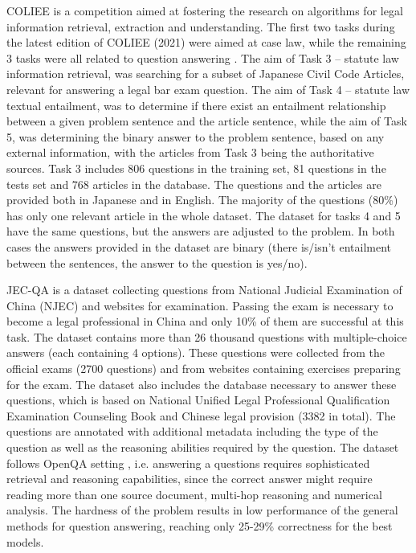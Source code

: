 \documentclass{IOS-Book-Article}
\begin{document}
COLIEE is a competition aimed at fostering the research on algorithms for legal information retrieval, extraction and understanding. The first two tasks during the latest edition of COLIEE (2021) were aimed at case law, while the remaining 3 tasks were all related to question answering \cite{rabelo2021summary}. The aim of Task 3 -- statute law information retrieval, was searching for a subset of Japanese Civil Code Articles, relevant for answering a legal bar exam question.
The aim of Task 4 -- statute law textual entailment, was to determine if there exist an entailment relationship between a given problem sentence and the article sentence, while the aim of Task 5, was determining the binary answer to the problem sentence, based on any external information, with the articles from Task 3 being the authoritative sources.  Task 3 includes 806 questions in the training set, 81 questions in the tests set and 768 articles in the database. The questions and the articles are provided both in Japanese and in English. The majority of the questions (80\%) has only one relevant article in the whole dataset. The dataset for tasks 4 and 5 have the same questions, but the answers are adjusted to the problem. In both cases the answers provided in the dataset are binary
(there is/isn't entailment between the sentences, the answer to the question is yes/no).

JEC-QA \cite{zhong2019jecqa} is a dataset collecting questions from National Judicial Examination of China (NJEC) and websites for examination. Passing the exam is necessary to become a legal professional in China and only 10\% of them are successful at this task. The dataset contains more than 26 thousand questions with multiple-choice answers (each containing 4 options). These questions were collected from the official exams (2700 questions) and from websites containing exercises
preparing for the exam. The dataset also includes the database necessary to answer these questions, which is based on National Unified Legal Professional Qualification Examination Counseling Book and Chinese legal provision (3382 in total). The questions are annotated with additional metadata including the type of the question as well as the reasoning abilities required by the question.
The dataset follows OpenQA setting \cite{chen2017reading}, i.e. answering a questions requires sophisticated retrieval and reasoning capabilities, since the correct answer might require reading more than one source document, multi-hop reasoning and numerical analysis. The hardness of the problem results in low performance of the general methods for question answering, reaching only 25-29\% correctness for the best models.
\end{document}

